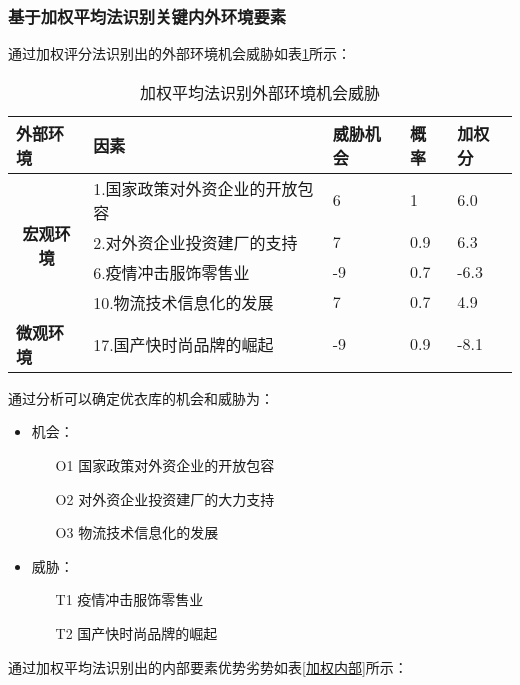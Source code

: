 \documentclass{xjtureport}
\begin{document}
\subsubsection{基于加权平均法识别关键内外环境要素}
通过加权评分法识别出的外部环境机会威胁如表\ref{加权外部}所示：
\begin{table}[H]
    \renewcommand\arraystretch{1.5}
    \centering
    \caption{加权平均法识别外部环境机会威胁}
    \label{加权外部}
    \begin{tabular}{c|llll}
    \hline
    \multicolumn{1}{l|}{\textbf{外部环境}} & \textbf{因素}      & \textbf{威胁机会} & \textbf{概率} & \textbf{加权分} \\ \hline
    \multirow{4}{*}{\textbf{宏观环境}}     & 1.国家政策对外资企业的开放包容 & 6             & 1           & 6.0          \\
                                       & 2.对外资企业投资建厂的支持   & 7             & 0.9         & 6.3          \\
                                       & 6.疫情冲击服饰零售业      & -9            & 0.7         & -6.3         \\
                                       & 10.物流技术信息化的发展    & 7             & 0.7         & 4.9          \\\hline
    \multicolumn{1}{l|}{\textbf{微观环境}} & 17.国产快时尚品牌的崛起    & -9            & 0.9         & -8.1         \\ \hline
    \end{tabular}
    \end{table}
    通过分析可以确定优衣库的机会和威胁为：
    \begin{itemize}
        \item 机会：
        \begin{itemize}
            \item[O1] 国家政策对外资企业的开放包容
            \item[O2] 对外资企业投资建厂的大力支持
            \item[O3] 物流技术信息化的发展   
        \end{itemize}
        \item 威胁：
        \begin{itemize}
            \item [T1] 疫情冲击服饰零售业
            \item [T2] 国产快时尚品牌的崛起
        \end{itemize}
    \end{itemize}
    通过加权平均法识别出的内部要素优势劣势如表\ref{加权内部}所示：
\end{document}
